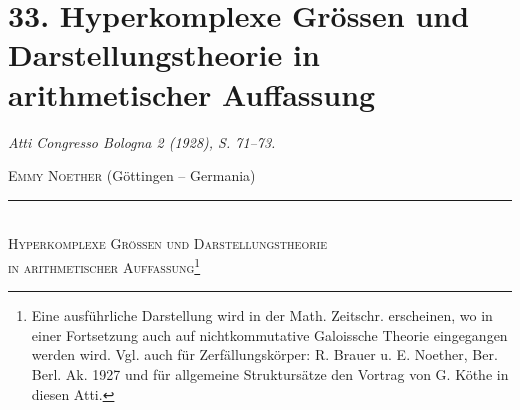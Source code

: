 \section*{33. Hyperkomplexe Grössen und Darstellungstheorie in arithmetischer Auffassung}
\emph{Atti Congresso Bologna 2 (1928), S. 71--73.}

\begingroup
\renewcommand{\thefootnote}{(\arabic{footnote})}

\begin{center}
\textsc{Emmy Noether} (Göttingen -- Germania)\\[-0.1em]
\rule{3em}{0.4pt}\\[0.8em]
\textsc{Hyperkomplexe Grössen und Darstellungstheorie}\\
\textsc{in arithmetischer Auffassung}\footnote{Eine ausführliche Darstellung wird in der Math. Zeitschr. erscheinen, wo in einer Fortsetzung auch auf nichtkommutative Galoissche Theorie eingegangen werden wird. Vgl. auch für \guillemotleft Zerfällungskörper\guillemotright: R. Brauer u. E. Noether, Ber. Berl. Ak. 1927 und für allgemeine Struktursätze den Vortrag von G. Köthe in diesen Atti.}
\end{center}

